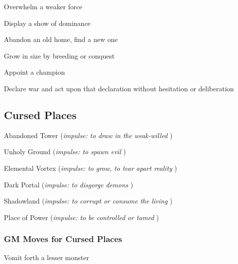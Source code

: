  
\item Overwhelm a weaker force

 
\item Display a show of dominance

 
\item Abandon an old home, find a new one

 
\item Grow in size by breeding or conquest

 
\item Appoint a champion

 
\item Declare war and act upon that declaration without hesitation or deliberation


\stopitemize
 
\subsection{Cursed Places}    
 
\startitemize[1,packed]

\item Abandoned Tower ({\em impulse: to draw in the weak-willed} )

 
\item Unholy Ground ({\em impulse: to spawn evil} )

 
\item Elemental Vortex ({\em impulse: to grow, to tear apart reality} )

 
\item Dark Portal ({\em impulse: to disgorge demons} )

 
\item Shadowland ({\em impulse: to corrupt or consume the living} )

 
\item Place of Power ({\em impulse: to be controlled or tamed} )


\stopitemize
 
\subsubsection{GM Moves for Cursed Places}      
 
\startitemize[1,packed]

\item Vomit forth a lesser monster

